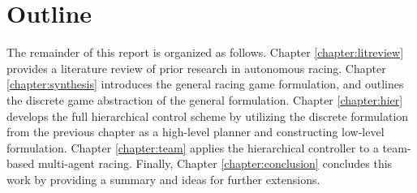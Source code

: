 \section{Outline}
The remainder of this report is organized as follows. 
Chapter \ref{chapter:litreview} provides a literature review of prior research in autonomous racing. 
Chapter \ref{chapter:synthesis} introduces the general racing game formulation, and outlines the discrete game abstraction of the general formulation. 
Chapter \ref{chapter:hier} develops the full hierarchical control scheme by utilizing the discrete formulation from the previous chapter as a high-level planner and constructing low-level formulation. 
Chapter \ref{chapter:team} applies the hierarchical controller to a team-based multi-agent racing. 
Finally, Chapter \ref{chapter:conclusion} concludes this work by providing a summary and ideas for further extensions. 